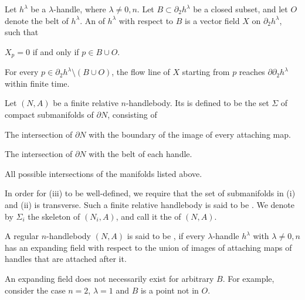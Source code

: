 \begin{definition}
    Let $h^\lambda$ be a $\lambda$-handle, where $\lambda\neq0,n$.
    Let $B\subset\partial_2h^\lambda$ be a closed subset,
    and let $O$ denote the belt of $h^\lambda$.
    An  of $h^\lambda$ with respect to $B$
    is a vector field $X$ on $\partial_2h^\lambda$, such that
    \begin{itms}
        \item $X_p=0$ if and only if $p\in B\cup O$.
        \item For every $p\in\partial_2h^\lambda\setminus(B\cup O)$,
        the flow line of $X$ starting from $p$ reaches $\partial\partial_2h^\lambda$ within finite time.
    \end{itms}
    
    Let $(N,A)$ be a finite relative $n$-handlebody.
    Its  is defined to be the set $\Sigma$ of compact submanifolds of $\partial N$,
    consisting of
    \begin{enum}
        \item The intersection of $\partial N$ with
        the boundary of the image of every attaching map.
        \item The intersection of $\partial N$ with
        the belt of each handle.
        \item All possible intersections of the manifolds listed above.
    \end{enum}
    In order for \textup{(iii)} to be well-defined, we require that
    the set of submanifolds in \textup{(i)} and \textup{(ii)} is transverse.
    Such a finite relative handlebody is said to be .
    We denote by $\Sigma_i$ the skeleton of $(N_i,A)$,
    and call it the  of $(N,A)$.
    
    A regular $n$-handlebody $(N,A)$ is said to be ,
    if every $\lambda$-handle $h^\lambda$ with $\lambda\neq0,n$ has an expanding field
    with respect to the union of images of attaching maps of handles
    that are attached after it.
\end{definition}

An expanding field does not necessarily exist for arbitrary $B$.
For example, consider the case $n=2$, $\lambda=1$ and $B$ is a point not in $O$.

